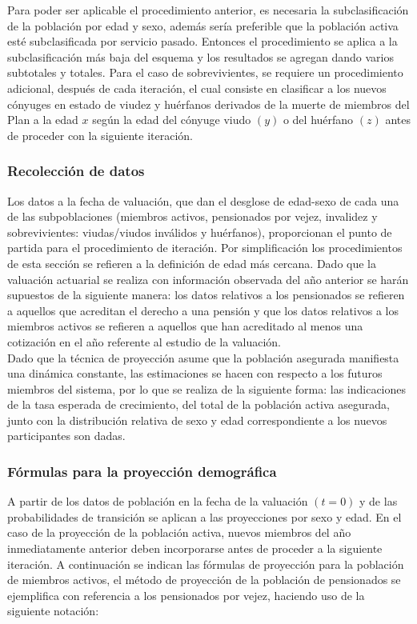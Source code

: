 \documentclass[12pt,letterpaper,titlepage]{article}
\begin{document}
{Para poder ser aplicable el procedimiento anterior, es necesaria la subclasificación de la población por edad y sexo, además sería preferible que la población activa esté subclasificada por servicio pasado. Entonces el procedimiento se aplica a la subclasificación más baja del esquema y los resultados se agregan dando varios subtotales y totales. Para el caso de sobrevivientes, se requiere un procedimiento adicional, después de cada iteración, el cual consiste en clasificar a los nuevos cónyuges en estado de viudez y huérfanos derivados de la muerte de miembros del Plan a la edad $x$ según la edad del cónyuge viudo $(y)$ o del huérfano $(z)$ antes de proceder con la siguiente iteración. \\

\subsubsection{Recolección de datos}

Los datos a la fecha de valuación, que dan el desglose de edad-sexo de cada una de las subpoblaciones (miembros activos, pensionados por vejez, invalidez y sobrevivientes: viudas/viudos inválidos y huérfanos), proporcionan el punto de partida para el procedimiento de iteración. Por simplificación los procedimientos de esta sección se refieren a la definición de edad más cercana. Dado que la valuación actuarial se realiza con información observada del año anterior se harán supuestos de la siguiente manera: los datos relativos a los pensionados se refieren a aquellos que acreditan el derecho a una pensión y que los datos relativos a los miembros activos se refieren a aquellos que han acreditado al menos una cotización en el año referente al estudio de la valuación.\\

Dado que la técnica de proyección asume que la población asegurada manifiesta una dinámica constante, las estimaciones se hacen con respecto a los futuros miembros del sistema, por lo que se realiza de la siguiente forma: las indicaciones de la tasa esperada de crecimiento, del total de la población activa asegurada, junto con la distribución relativa de sexo y edad correspondiente a los nuevos participantes son dadas. 

\subsubsection{Fórmulas para la proyección demográfica}

A partir de los datos de población en la fecha de la valuación $(t=0)$ y de las probabilidades de transición se aplican a las proyecciones por sexo y edad. En el caso de la proyección de la población activa, nuevos miembros del año inmediatamente anterior deben incorporarse antes de proceder a la siguiente iteración. A continuación se indican las fórmulas de proyección para la población de miembros activos, el método de proyección de la población de pensionados se ejemplifica con referencia a los pensionados por vejez, haciendo uso de la siguiente notación:\\

}
\end{document}
